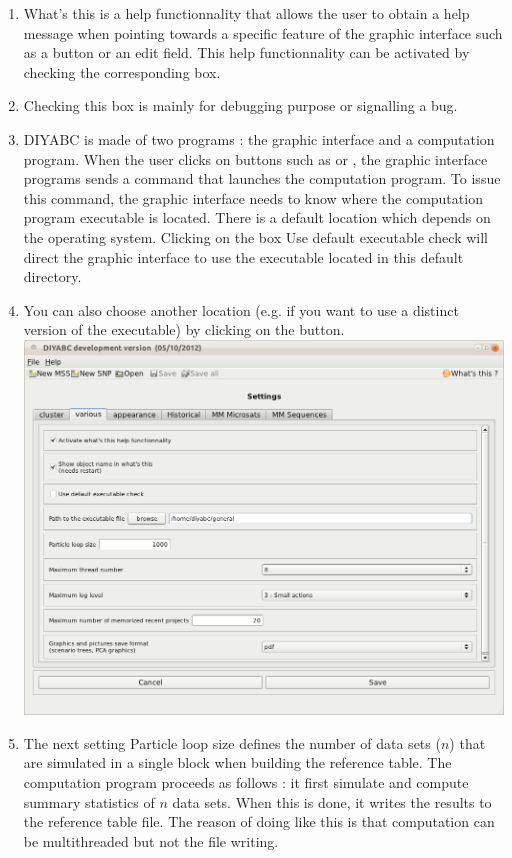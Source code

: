 \begin{enumerate}
 \item \textsf{What's this} is a help functionnality that allows the user to obtain a help message when pointing towards a specific feature of the graphic interface such as a button or an edit field. This help functionnality can be activated by checking the corresponding box.
 \item Checking this box is mainly for debugging purpose or signalling a bug. 
 \item DIYABC is made of two programs : the graphic interface and a computation program. When the user clicks on buttons such as   or , the graphic interface programs sends a command that launches the computation program. To issue this command, the graphic interface needs to know where the computation program executable is located. There is a default location which depends on the operating system. Clicking on the box \textsf{Use default executable check} will direct the graphic interface to use the executable located in this default directory.
 \item You can also choose another location (e.g. if you want to use a distinct version of the executable) by clicking on the  button.\\
\includegraphics[scale=0.33]{gui_pictures/Capture-DIYABC-94.png} \\
 \item The next setting \textsf{Particle loop size} defines the number of data sets ($n$) that are simulated in a single block when building the reference table. The computation program proceeds as follows : it first simulate and compute summary statistics of $n$ data sets. When this is done, it writes the results to the reference table file. The reason of doing like this is that computation can be multithreaded but not the file writing.

\end{enumerate}
